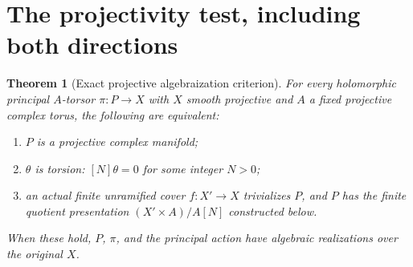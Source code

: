 \documentclass[11pt]{article}
\newtheorem{theorem}{Theorem}
\begin{document}
\section{The projectivity test, including both directions}
\begin{theorem}[Exact projective algebraization criterion]\label{thm:proj}
For every holomorphic principal $A$-torsor $\pi:P\to X$ with $X$ smooth
projective and $A$ a fixed projective complex torus, the following are equivalent:
\begin{enumerate}
\item $P$ is a projective complex manifold;
\item $\theta$ is torsion: $[N]\theta=0$ for some integer $N>0$;
\item an actual finite unramified cover $f:X'\to X$ trivializes $P$, and
$P$ has the finite quotient presentation $(X'\times A)/A[N]$ constructed below.
\end{enumerate}
When these hold, $P$, $\pi$, and the principal action have algebraic
realizations over the original $X$.
\end{theorem}
\end{document}
